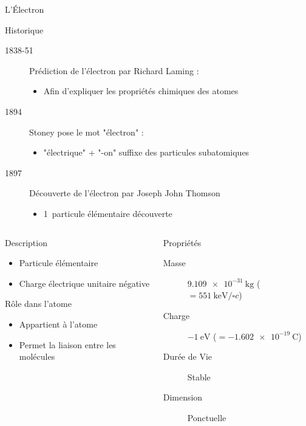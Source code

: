 \documentclass[handout,8pt]{beamer} %
\begin{document}
\begin{frame}{L'Électron}
		
	\begin{block}{Historique}
		\begin{description}
			\item[1838-51] Prédiction de l'électron par Richard Laming :
			\begin{itemize}
				\item Afin d'expliquer les propriétés chimiques des atomes
			\end{itemize}
			\item[1894] Stoney pose le mot "électron" :
			\begin{itemize}
				\item  "électrique" + "-on" suffixe des particules subatomiques
			\end{itemize}
			\item[1897] Découverte de l'électron par Joseph John Thomson
			\begin{itemize}
				\item  1\iere\ particule élémentaire découverte
			\end{itemize}
		\end{description}
	\end{block}

	\begin{columns}
		\begin{column}{0.5\textwidth}
			\begin{block}{Description}
				\begin{itemize}
					\item Particule élémentaire
					\item Charge électrique unitaire négative
				\end{itemize}
			\end{block}
			\begin{block}{Rôle dans l'atome}
				\begin{itemize}
					\item Appartient à l'atome
					\item Permet la liaison entre les molécules
				\end{itemize}
			\end{block}
		\end{column}
		\begin{column}{0.5\textwidth}
			\begin{block}{Propriétés}
				\begin{description}
					\item[Masse] $ \SI{9.109e-31}{\kilogram} $ 
								($ = \SI{551}{\keV\per\square c}$)
					\item[Charge] $\SI{-1}{\eV}$ 
								($ = \SI{-1.602e-19}{\coulomb}$)
					\item[Durée de Vie] Stable
					\item[Dimension] Ponctuelle
				\end{description}
			\end{block}
		\end{column}
	\end{columns}
	
\end{frame}
\end{document}
